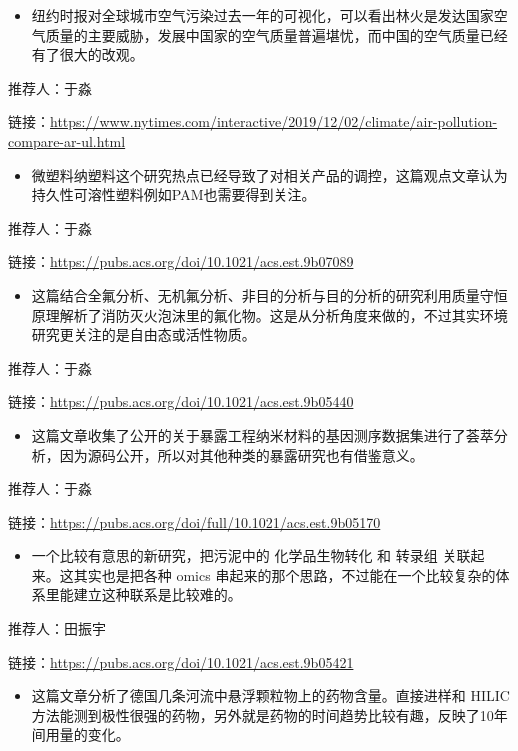 \documentclass[
]{book}
\providecommand{\tightlist}{%
  \setlength{\itemsep}{0pt}\setlength{\parskip}{0pt}}
\begin{document}
\begin{itemize}
\tightlist
\item
  纽约时报对全球城市空气污染过去一年的可视化，可以看出林火是发达国家空气质量的主要威胁，发展中国家的空气质量普遍堪忧，而中国的空气质量已经有了很大的改观。
\end{itemize}

推荐人：于淼

链接：\url{https://www.nytimes.com/interactive/2019/12/02/climate/air-pollution-compare-ar-ul.html}

\begin{itemize}
\tightlist
\item
  微塑料纳塑料这个研究热点已经导致了对相关产品的调控，这篇观点文章认为持久性可溶性塑料例如PAM也需要得到关注。
\end{itemize}

推荐人：于淼

链接：\url{https://pubs.acs.org/doi/10.1021/acs.est.9b07089}

\begin{itemize}
\tightlist
\item
  这篇结合全氟分析、无机氟分析、非目的分析与目的分析的研究利用质量守恒原理解析了消防灭火泡沫里的氟化物。这是从分析角度来做的，不过其实环境研究更关注的是自由态或活性物质。
\end{itemize}

推荐人：于淼

链接：\url{https://pubs.acs.org/doi/10.1021/acs.est.9b05440}

\begin{itemize}
\tightlist
\item
  这篇文章收集了公开的关于暴露工程纳米材料的基因测序数据集进行了荟萃分析，因为源码公开，所以对其他种类的暴露研究也有借鉴意义。
\end{itemize}

推荐人：于淼

链接：\url{https://pubs.acs.org/doi/full/10.1021/acs.est.9b05170}

\begin{itemize}
\tightlist
\item
  一个比较有意思的新研究，把污泥中的 化学品生物转化 和 转录组 关联起来。这其实也是把各种 omics 串起来的那个思路，不过能在一个比较复杂的体系里能建立这种联系是比较难的。
\end{itemize}

推荐人：田振宇

链接：\url{https://pubs.acs.org/doi/10.1021/acs.est.9b05421}

\begin{itemize}
\tightlist
\item
  这篇文章分析了德国几条河流中悬浮颗粒物上的药物含量。直接进样和 HILIC 方法能测到极性很强的药物，另外就是药物的时间趋势比较有趣，反映了10年间用量的变化。
\end{itemize}
\end{document}
